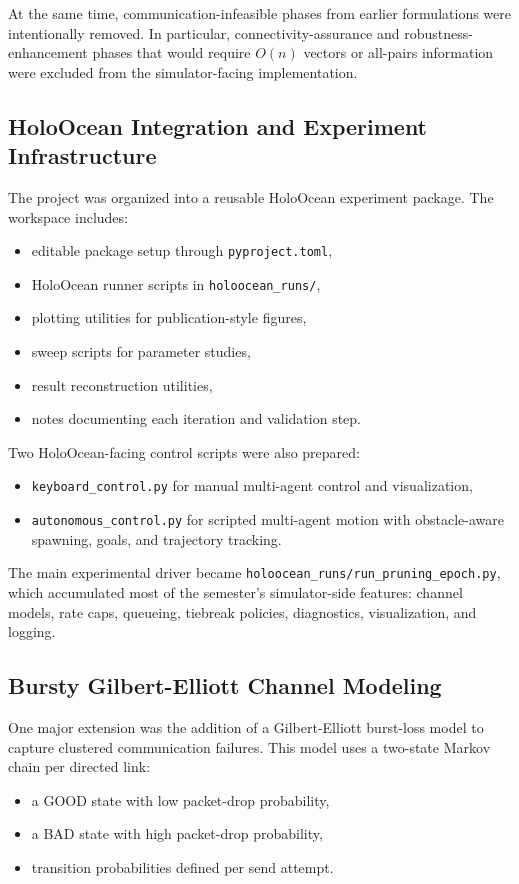 \documentclass[11pt,a4paper]{article}
\begin{document}
At the same time, communication-infeasible phases from earlier formulations were intentionally removed. In particular, connectivity-assurance and robustness-enhancement phases that would require \(O(n)\) vectors or all-pairs information were excluded from the simulator-facing implementation.

\subsection{HoloOcean Integration and Experiment Infrastructure}

The project was organized into a reusable HoloOcean experiment package. The workspace includes:
\begin{itemize}
  \item editable package setup through \texttt{pyproject.toml},
  \item HoloOcean runner scripts in \texttt{holoocean\_runs/},
  \item plotting utilities for publication-style figures,
  \item sweep scripts for parameter studies,
  \item result reconstruction utilities,
  \item notes documenting each iteration and validation step.
\end{itemize}

Two HoloOcean-facing control scripts were also prepared:
\begin{itemize}
  \item \texttt{keyboard\_control.py} for manual multi-agent control and visualization,
  \item \texttt{autonomous\_control.py} for scripted multi-agent motion with obstacle-aware spawning, goals, and trajectory tracking.
\end{itemize}

The main experimental driver became \texttt{holoocean\_runs/run\_pruning\_epoch.py}, which accumulated most of the semester's simulator-side features: channel models, rate caps, queueing, tiebreak policies, diagnostics, visualization, and logging.

\subsection{Bursty Gilbert-Elliott Channel Modeling}

One major extension was the addition of a Gilbert-Elliott burst-loss model to capture clustered communication failures. This model uses a two-state Markov chain per directed link:
\begin{itemize}
  \item a GOOD state with low packet-drop probability,
  \item a BAD state with high packet-drop probability,
  \item transition probabilities defined per send attempt.
\end{itemize}
\end{document}
